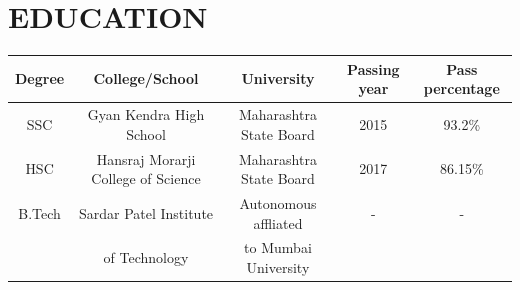 \documentclass{article}
\begin{document}
\section*{\textbf{EDUCATION}}
\begin{tabular}{|c|c|c|c|c|}
\hline
Degree & College/School & University & Passing year & Pass percentage\\
\hline
SSC & Gyan Kendra High School & Maharashtra State Board & 2015 & 93.2\%\\
\hline
HSC & Hansraj Morarji College of Science & Maharashtra State Board & 2017 & 86.15\%\\
\hline
B.Tech & Sardar Patel Institute& Autonomous affliated  & - & -\\
 & of Technology & to Mumbai University & & \\
\hline 
\end{tabular}
\end{document}
